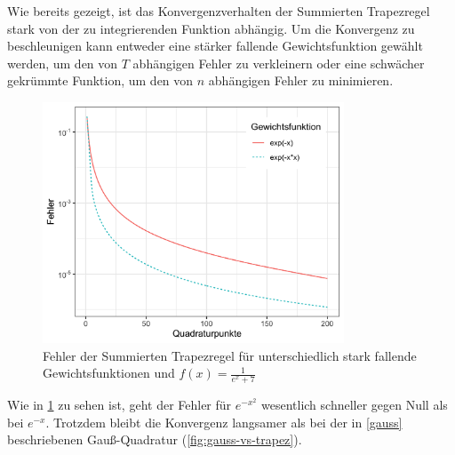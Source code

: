 \documentclass[12pt,a4paper]{scrartcl}
\numberwithin{equation}{section}
\numberwithin{myalgctr}{section}
\numberwithin{mytheoremctr}{subsection}
\numberwithin{mykorollarctr}{subsection}
\numberwithin{mylemmactr}{subsection}
\numberwithin{mybeispielctr}{subsection}
\begin{document}
	Wie bereits gezeigt, ist das Konvergenzverhalten der Summierten Trapezregel stark von der zu integrierenden Funktion abh\"angig. Um die Konvergenz zu beschleunigen kann entweder eine st\"arker fallende Gewichtsfunktion gew\"ahlt werden, um den von $T$ abh\"angigen Fehler zu verkleinern oder eine schw\"acher gekr\"ummte Funktion, um den von $n$ abh\"angigen Fehler zu minimieren.  
		\begin{figure}[H]
		\begin{center}
			\includegraphics[width=0.8\textwidth]{../plots/aufgabe-e-vergleich-trapez-gewichtsfnkt.png}
		\end{center}
		\caption{Fehler der Summierten Trapezregel f\"ur unterschiedlich stark fallende Gewichtsfunktionen und $f(x)=\frac{1}{e^x+7}$}
		\label{fig:gewichtsfunktionen-vergleich}	
	\end{figure}
	

	Wie in \cref{fig:gewichtsfunktionen-vergleich} zu sehen ist, geht der Fehler f\"ur $e^{-x^2}$ wesentlich schneller gegen Null als bei $e^{-x}$. Trotzdem bleibt die Konvergenz langsamer als bei der in \cref{gauss} beschriebenen Gau\ss -Quadratur (\cref{fig:gauss-vs-trapez}).
	
\end{document}
